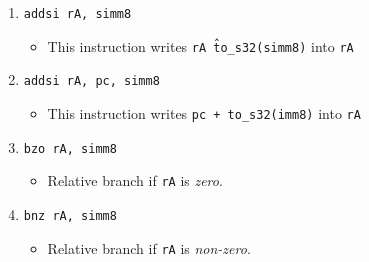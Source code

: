 \documentclass{article}
\begin{document}
\begin{itemize}
\begin{enumerate}
			\item \texttt{addsi rA, simm8}
				\begin{itemize}
				\item This instruction writes \texttt{rA \^ to\_s32(simm8)}
					into \texttt{rA}
				\end{itemize}
			\item \texttt{addsi rA, pc, simm8}
				\begin{itemize}
				\item This instruction writes \texttt{pc + to\_s32(imm8)}
					into \texttt{rA}
				\end{itemize}

			\item \texttt{bzo rA, simm8}
				\begin{itemize}
				\item Relative branch if \texttt{rA} is \textit{zero}.
				\end{itemize}
			\item \texttt{bnz rA, simm8}
				\begin{itemize}
				\item Relative branch if \texttt{rA} is \textit{non-zero}.
				\end{itemize}
			\end{enumerate}
		\end{itemize}
\end{document}
